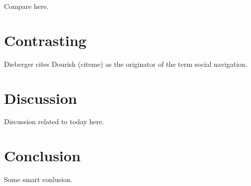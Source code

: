 \documentclass[12pt,a4paper]{article}
\begin{document}
Compare here.

\section{Contrasting}

Dieberger cites Dourish (citeme) as the originator of the term social
navigation.

\section{Discussion}

Discussion related to today here.

\section{Conclusion}

Some smart conlusion.

\section{}




\end{document}
